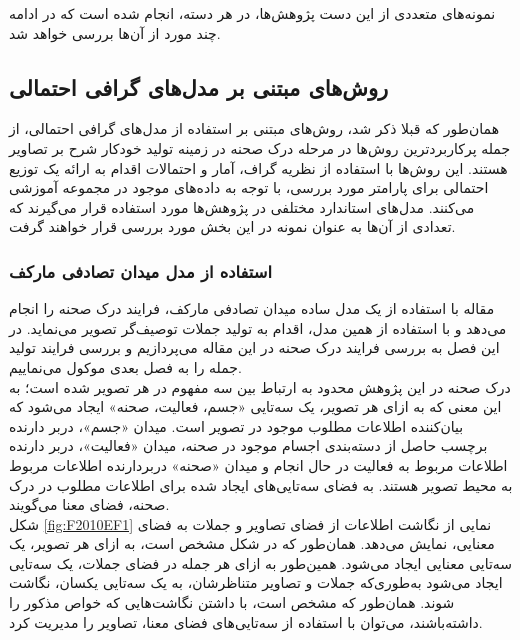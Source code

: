نمونه‌های متعددی از این دست پژوهش‌ها، در هر دسته، انجام شده است که در ادامه چند مورد از آن‌ها بررسی خواهد شد.

\subsection{روش‌های مبتنی بر مدل‌های گرافی احتمالی}

همان‌طور که قبلا ذکر شد، روش‌های مبتنی بر استفاده از مدل‌های گرافی احتمالی، از جمله پرکاربردترین روش‌ها در مرحله درک صحنه در زمینه تولید خودکار شرح بر تصاویر هستند. این روش‌ها با استفاده از نظریه گراف، آمار و احتمالات اقدام به ارائه یک توزیع احتمالی برای پارامتر مورد بررسی، با توجه به داده‌های موجود در مجموعه آموزشی می‌کنند. مدل‌های استاندارد مختلفی در پژوهش‌ها مورد استفاده قرار می‌گیرند که تعدادی از آن‌ها به عنوان نمونه در این بخش مورد بررسی قرار خواهند گرفت.
\subsubsection[استفاده از مدل میدان تصادفی مارکف]{استفاده از مدل میدان تصادفی مارکف}
مقاله
\cite{Farhadi2010every}
با استفاده از یک مدل ساده میدان تصادفی مارکف، فرایند درک صحنه را انجام می‌دهد و با استفاده از همین مدل، اقدام به تولید جملات توصیف‌گر تصویر می‌نماید. در این فصل به بررسی فرایند درک صحنه در این مقاله می‌پردازیم و بررسی فرایند تولید جمله را به فصل بعدی موکول می‌نماییم.
\\
درک صحنه در این پژوهش محدود به ارتباط بین سه مفهوم در هر تصویر شده است؛ به این معنی که به ازای هر تصویر، یک سه‌تایی «جسم، فعالیت، صحنه»
ایجاد می‌شود که بیان‌کننده اطلاعات مطلوب موجود در تصویر است. میدان «جسم»، دربر دارنده‌ برچسب حاصل از دسته‌بندی اجسام موجود در صحنه، میدان «فعالیت»، دربر دارنده اطلاعات مربوط به فعالیت در حال انجام و میدان «صحنه» دربردارنده اطلاعات مربوط به محیط تصویر هستند. به فضای سه‌تایی‌های ایجاد شده برای اطلاعات مطلوب در درک صحنه، فضای معنا می‌گویند.
\\
شکل
\ref{fig:F2010EF1}
نمایی از نگاشت اطلاعات از فضای تصاویر و جملات به فضای معنایی، نمایش می‌دهد. همان‌طور که در شکل مشخص است، به ازای هر تصویر، یک سه‌تایی معنایی ایجاد می‌شود. همین‌طور به ازای هر جمله در فضای جملات، یک سه‌تایی ایجاد می‌شود به‌طوری‌که جملات و تصاویر متناظرشان، به یک سه‌تایی یکسان، نگاشت شوند. همان‌طور که مشخص است، با داشتن نگاشت‌هایی  که خواص مذکور را داشته‌باشند، می‌توان با استفاده از سه‌تایی‌های فضای معنا، تصاویر را مدیریت کرد.

